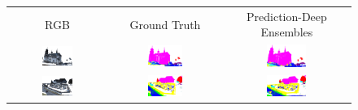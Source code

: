     \begin{figure}[h!]
        \begin{tabular}{ccc}
            RGB & Ground Truth & Prediction-Deep Ensembles \\
            \includegraphics[width=0.33\textwidth, height=0.18\textheight]{images/seg_output/sem3d_seg_output/1_RGB.png} &
            \includegraphics[width=0.33\textwidth, height=0.18\textheight]{images/seg_output/sem3d_seg_output/1_GT.png}& 
            \includegraphics[width=0.33\textwidth, height=0.18\textheight]{images/seg_output/sem3d_seg_output/1_Pred.png}\\

            \includegraphics[width=0.33\textwidth, height=0.18\textheight]{images/seg_output/sem3d_seg_output/2_RGB.png} &
            \includegraphics[width=0.33\textwidth, height=0.18\textheight]{images/seg_output/sem3d_seg_output/2_GT.png}& 
            \includegraphics[width=0.33\textwidth, height=0.18\textheight]{images/seg_output/sem3d_seg_output/2_Pred.png}\\


\end{tabular}
\end{figure}
